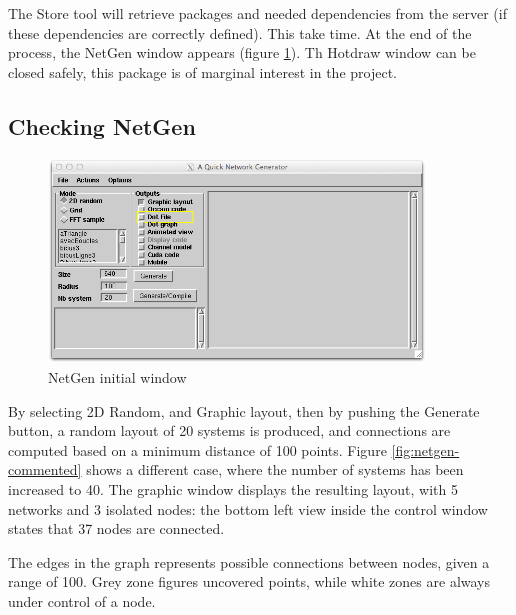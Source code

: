 \documentclass[times]{book}
\begin{document}
The Store tool will retrieve packages and needed dependencies from the server (if these dependencies
are correctly defined). This take time. At the end of the process, the NetGen window appears (figure  \ref{fig:netgen-initial}).
Th Hotdraw window can be closed safely, this package is of marginal interest in the project.


\subsection {Checking NetGen }
\begin{figure}[hbtp]
\begin{center} 
\includegraphics[width=10cm]{netgen-initial.png}
\caption{NetGen initial window }
\label{fig:netgen-initial}
\end{center}
\end{figure}

By selecting 2D Random, and Graphic layout, then by pushing the Generate button,  a random layout
of 20 systems is produced, and connections are computed based on a minimum distance of 100 points.
Figure \ref{fig:netgen-commented} shows a different case, where the number of systems has been
increased to 40. The graphic window displays the resulting layout, with 5 networks and 3 isolated nodes:
the bottom left view inside the control window states that 37 nodes are connected. 

The edges in the graph represents possible connections between nodes, given a range of 100. Grey zone figures
uncovered points, while white zones are always under control of a node.
\end{document}
